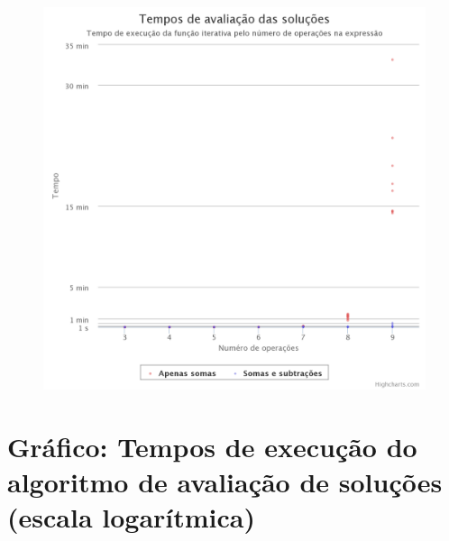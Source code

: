 \documentclass[
	12pt,				%
	openright,			%
	twoside,			%
	a4paper,			%
	english,			%
	french,				%
	spanish,			%
	brazil				%
	]{abntex2}
\begin{document}
\begin{anexosenv}
\begin{figure}[H]
	\begin{center}
	    \includegraphics[scale=0.38]{timming_test_lin.png}
	\end{center}
\end{figure}

\chapter{Gráfico: Tempos de execução do algoritmo de avaliação de soluções (escala logarítmica)}


\end{anexosenv}
\end{document}
